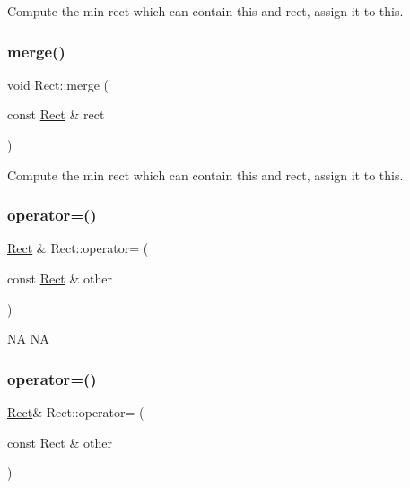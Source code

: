 Compute the min rect which can contain this and rect, assign it to this. \mbox{\label{classRect_aafc3d3683de418f92a7089c7b7a777e0}} 
\subsubsection{\texorpdfstring{merge()}{merge()}\hspace{0.1cm}{\footnotesize\ttfamily [2/2]}}
{\footnotesize\ttfamily void Rect\+::merge (\begin{DoxyParamCaption}\item[{const \hyperlink{classRect}{Rect} \&}]{rect }\end{DoxyParamCaption})}

Compute the min rect which can contain this and rect, assign it to this. \mbox{\label{classRect_addbc75d3b9aefa1cc63a6d81009a3c38}} 
\subsubsection{\texorpdfstring{operator=()}{operator=()}\hspace{0.1cm}{\footnotesize\ttfamily [1/2]}}
{\footnotesize\ttfamily \hyperlink{classRect}{Rect} \& Rect\+::operator= (\begin{DoxyParamCaption}\item[{const \hyperlink{classRect}{Rect} \&}]{other }\end{DoxyParamCaption})}

NA  NA \mbox{\label{classRect_ab01255985652564479c2c5343dbca9a7}} 
\subsubsection{\texorpdfstring{operator=()}{operator=()}\hspace{0.1cm}{\footnotesize\ttfamily [2/2]}}
{\footnotesize\ttfamily \hyperlink{classRect}{Rect}\& Rect\+::operator= (\begin{DoxyParamCaption}\item[{const \hyperlink{classRect}{Rect} \&}]{other }\end{DoxyParamCaption})}

